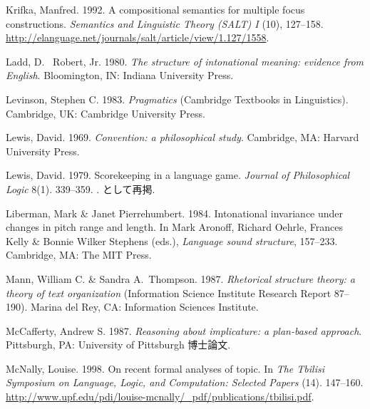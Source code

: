 \documentclass{goken}
\newcommand{\ori}[1]{\noindent\textcolor[gray]{0.7}{\fontsize{8pt}{8pt}\selectfont{\textsf{(p.~#1)}}} }
\begin{document}
\begin{thebibliography}{74}
Krifka, Manfred. 1992.
\newblock A compositional semantics for multiple focus constructions.
\newblock \emph{Semantics and Linguistic Theory (SALT) I} (10), 127--158.
\newblock
  \urlprefix\url{http://elanguage.net/journals/salt/article/view/1.127/1558}.

	Ladd, D.~ Robert, Jr. 1980.
\newblock \emph{The structure of intonational meaning: evidence from
  {E}nglish}.
\newblock Bloomington, IN: Indiana University Press.

Levinson, Stephen C. 1983.
\newblock \emph{Pragmatics} (Cambridge Textbooks in Linguistics).
\newblock Cambridge, UK: Cambridge University Press.

Lewis, David. 1969.
\newblock \emph{Convention: a philosophical study}.
\newblock Cambridge, MA: Harvard University Press.

Lewis, David. 1979.
\newblock Scorekeeping in a language game.
\newblock \emph{Journal of Philosophical Logic} 8(1). 339--359.
\newblock {}.
\newblock \citet[172--187]{BauerleEgliVonStechow1979}として再掲.

\ori{67}

Liberman, Mark \& Janet Pierrehumbert. 1984.
\newblock Intonational invariance under changes in pitch range and length.
\newblock In Mark Aronoff, Richard Oehrle, Frances Kelly \& Bonnie Wilker
  Stephens (eds.), \emph{Language sound structure}, 157--233. Cambridge, MA:
  The MIT Press.

\pagebreak
{}
Mann, William C. \& Sandra A.~Thompson. 1987.
\newblock \emph{Rhetorical structure theory: a theory of text organization}
  (Information Science Institute Research Report 87--190).
\newblock Marina del Rey, CA: Information Sciences Institute.

McCafferty, Andrew S. 1987.
\newblock \emph{Reasoning about implicature: a plan-based approach}.
\newblock Pittsburgh, PA: University of Pittsburgh 博士論文.

McNally, Louise. 1998.
\newblock On recent formal analyses of topic.
\newblock In \emph{The Tbilisi Symposium on Language, Logic, and Computation:
Selected Papers} (14). 147--160.
\newblock
  \urlprefix\url{http://www.upf.edu/pdi/louise-mcnally/_pdf/publications/tbilisi.pdf}.


\end{thebibliography}
\end{document}

